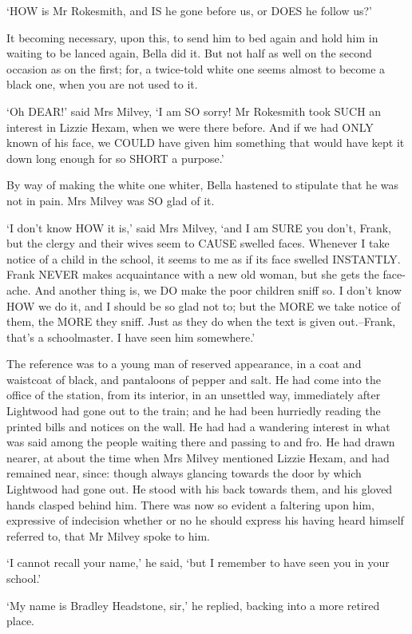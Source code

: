 ‘HOW is Mr Rokesmith, and IS he gone before us, or DOES he follow us?’

It becoming necessary, upon this, to send him to bed again and hold him
in waiting to be lanced again, Bella did it. But not half as well on
the second occasion as on the first; for, a twice-told white one seems
almost to become a black one, when you are not used to it.

‘Oh DEAR!’ said Mrs Milvey, ‘I am SO sorry! Mr Rokesmith took SUCH an
interest in Lizzie Hexam, when we were there before. And if we had ONLY
known of his face, we COULD have given him something that would have
kept it down long enough for so SHORT a purpose.’

By way of making the white one whiter, Bella hastened to stipulate that
he was not in pain. Mrs Milvey was SO glad of it.

‘I don’t know HOW it is,’ said Mrs Milvey, ‘and I am SURE you don’t,
Frank, but the clergy and their wives seem to CAUSE swelled faces.
Whenever I take notice of a child in the school, it seems to me as if
its face swelled INSTANTLY. Frank NEVER makes acquaintance with a new
old woman, but she gets the face-ache. And another thing is, we DO make
the poor children sniff so. I don’t know HOW we do it, and I should
be so glad not to; but the MORE we take notice of them, the MORE they
sniff. Just as they do when the text is given out.--Frank, that’s a
schoolmaster. I have seen him somewhere.’

The reference was to a young man of reserved appearance, in a coat and
waistcoat of black, and pantaloons of pepper and salt. He had come
into the office of the station, from its interior, in an unsettled way,
immediately after Lightwood had gone out to the train; and he had been
hurriedly reading the printed bills and notices on the wall. He had had
a wandering interest in what was said among the people waiting there
and passing to and fro. He had drawn nearer, at about the time when
Mrs Milvey mentioned Lizzie Hexam, and had remained near, since: though
always glancing towards the door by which Lightwood had gone out. He
stood with his back towards them, and his gloved hands clasped behind
him. There was now so evident a faltering upon him, expressive of
indecision whether or no he should express his having heard himself
referred to, that Mr Milvey spoke to him.

‘I cannot recall your name,’ he said, ‘but I remember to have seen you
in your school.’

‘My name is Bradley Headstone, sir,’ he replied, backing into a more
retired place.

